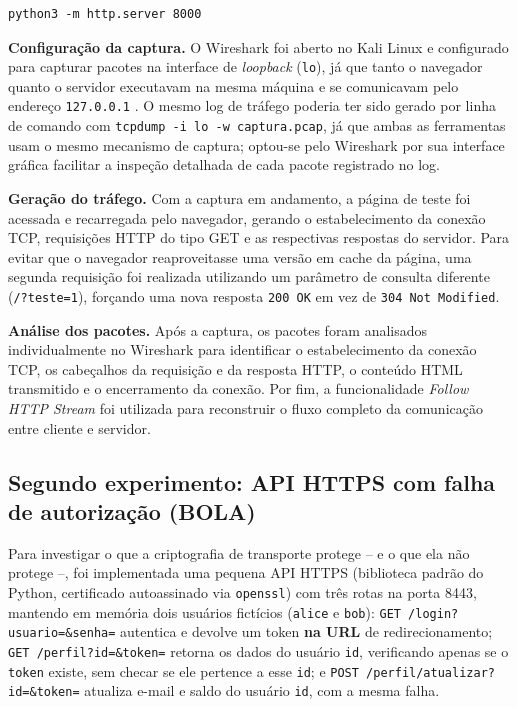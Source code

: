 \documentclass[12pt]{article}
\begin{document}
\begin{lstlisting}[caption={Comando utilizado para iniciar o servidor HTTP},label={lst:servidor}]
python3 -m http.server 8000
\end{lstlisting}

\textbf{Configuração da captura.} O Wireshark foi aberto no Kali Linux e
configurado para capturar pacotes na interface de \textit{loopback}
(\texttt{lo}), já que tanto o navegador quanto o servidor executavam na
mesma máquina e se comunicavam pelo endereço \texttt{127.0.0.1}
\cite{wireshark2024,kali2024}. O mesmo log de tráfego poderia ter sido
gerado por linha de comando com \texttt{tcpdump -i lo -w captura.pcap},
já que ambas as ferramentas usam o mesmo mecanismo de captura; optou-se
pelo Wireshark por sua interface gráfica facilitar a inspeção detalhada de
cada pacote registrado no log.

\textbf{Geração do tráfego.} Com a captura em andamento, a página de teste
foi acessada e recarregada pelo navegador, gerando o estabelecimento da
conexão TCP, requisições HTTP do tipo GET e as respectivas respostas do
servidor. Para evitar que o navegador reaproveitasse uma versão em cache da
página, uma segunda requisição foi realizada utilizando um parâmetro de
consulta diferente (\texttt{/?teste=1}), forçando uma nova resposta
\texttt{200 OK} em vez de \texttt{304 Not Modified}.

\textbf{Análise dos pacotes.} Após a captura, os pacotes foram analisados
individualmente no Wireshark para identificar o estabelecimento da conexão
TCP, os cabeçalhos da requisição e da resposta HTTP, o conteúdo HTML
transmitido e o encerramento da conexão. Por fim, a funcionalidade
\textit{Follow HTTP Stream} foi utilizada para reconstruir o fluxo completo
da comunicação entre cliente e servidor.

\subsection{Segundo experimento: API HTTPS com falha de autorização (BOLA)}

Para investigar o que a criptografia de transporte protege -- e o que ela
não protege --, foi implementada uma pequena API HTTPS (biblioteca padrão
do Python, certificado autoassinado via \texttt{openssl}) com três rotas
na porta 8443, mantendo em memória dois usuários fictícios (\texttt{alice}
e \texttt{bob}): \texttt{GET /login?usuario=\&senha=} autentica e devolve
um token \textbf{na URL} de redirecionamento; \texttt{GET
/perfil?id=\&token=} retorna os dados do usuário \texttt{id}, verificando
apenas se o \texttt{token} existe, sem checar se ele pertence a esse
\texttt{id}; e \texttt{POST /perfil/atualizar?id=\&token=} atualiza e-mail
e saldo do usuário \texttt{id}, com a mesma falha.
\end{document}
